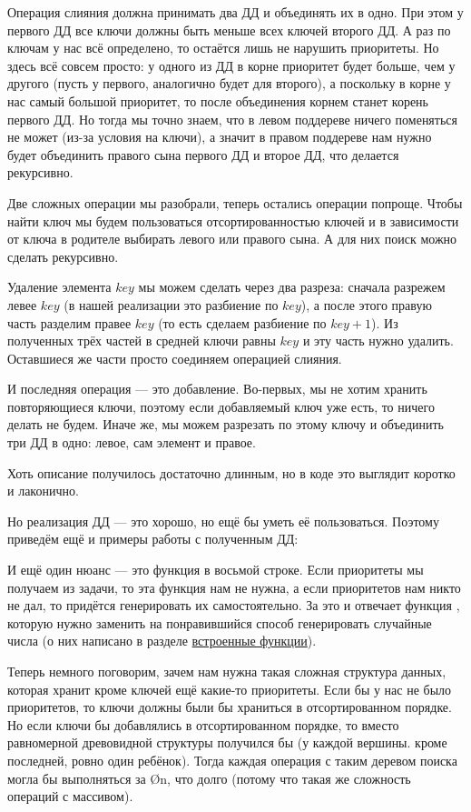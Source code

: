 Операция слияния должна принимать два ДД и объединять их в одно. При этом у первого ДД все ключи должны быть меньше всех ключей второго ДД. А раз по ключам у нас всё определено, то остаётся лишь не нарушить приоритеты. Но здесь всё совсем просто: у одного из ДД в корне приоритет будет больше, чем у другого (пусть у первого, аналогично будет для второго), а поскольку в корне у нас самый большой приоритет, то после объединения корнем станет корень первого ДД. Но тогда мы точно знаем, что в левом поддереве ничего поменяться не может (из-за условия на ключи), а значит в правом поддереве нам нужно будет объединить правого сына первого ДД и второе ДД, что делается рекурсивно.

Две сложных операции мы разобрали, теперь остались операции попроще. Чтобы найти ключ мы будем пользоваться отсортированностью ключей и в зависимости от ключа в родителе выбирать левого или правого сына. А для них поиск можно сделать рекурсивно.

Удаление элемента $key$ мы можем сделать через два разреза: сначала разрежем левее $key$ (в нашей реализации это разбиение по $key$), а после этого правую часть разделим правее $key$ (то есть сделаем разбиение по $key + 1$). Из полученных трёх частей в средней ключи равны $key$ и эту часть нужно удалить. Оставшиеся же части просто соединяем операцией слияния.

И последняя операция — это добавление. Во-первых, мы не хотим хранить повторяющиеся ключи, поэтому если добавляемый ключ уже есть, то ничего делать не будем. Иначе же, мы можем разрезать по этому ключу и объединить три ДД в одно: левое, сам элемент и правое.

Хоть описание получилось достаточно длинным, но в коде это выглядит коротко и лаконично.


Но реализация ДД — это хорошо, но ещё бы уметь её пользоваться. Поэтому приведём ещё и примеры работы с полученным ДД:


И ещё один нюанс — это функция  в восьмой строке. Если приоритеты мы получаем из задачи, то эта функция нам не нужна, а если приоритетов нам никто не дал, то придётся генерировать их самостоятельно. За это и отвечает функция , которую нужно заменить на понравившийся способ генерировать случайные числа (о них написано в разделе \hyperlink{built-in function}{встроенные функции}).

Теперь немного поговорим, зачем нам нужна такая сложная структура данных, которая хранит кроме ключей ещё какие-то приоритеты. Если бы у нас не было приоритетов, то ключи должны были бы храниться в отсортированном порядке. Но если ключи бы добавлялись в отсортированном порядке, то вместо равномерной древовидной структуры получился бы  (у каждой вершины. кроме последней, ровно один ребёнок). Тогда каждая операция с таким деревом поиска могла бы выполняться за \O{n}, что долго (потому что такая же сложность операций с массивом).

